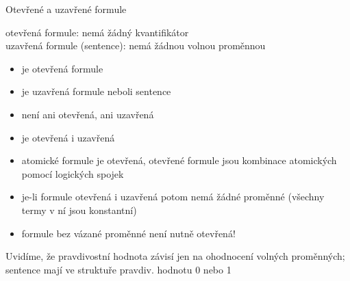 \documentclass{beamer}
\begin{document}
\begin{frame}{Otevřené a uzavřené formule}

    \alert{otevřená formule:} nemá žádný kvantifikátor\\ \pause 
    \alert{uzavřená formule (sentence):} nemá žádnou volnou proměnnou \pause 

     \begin{itemize}
        \item {} je otevřená formule \pause 
        \item {} je uzavřená formule  neboli sentence \pause 
        \item {} není ani otevřená, ani uzavřená \pause 
        \item {} je otevřená i uzavřená \pause 
        \item atomické formule je otevřená, otevřené formule jsou kombinace atomických pomocí logických spojek \pause 
        \item je-li formule otevřená i uzavřená potom nemá žádné proměnné (všechny termy v ní jsou konstantní) \pause 
        \item formule bez vázané proměnné není nutně otevřená! \pause 
    \end{itemize}

    Uvidíme, že \alert{pravdivostní hodnota} závisí jen na ohodnocení volných proměnných; \alert{sentence} mají ve struktuře pravdiv. hodnotu 0 nebo 1
    
\end{frame}
\end{document}
